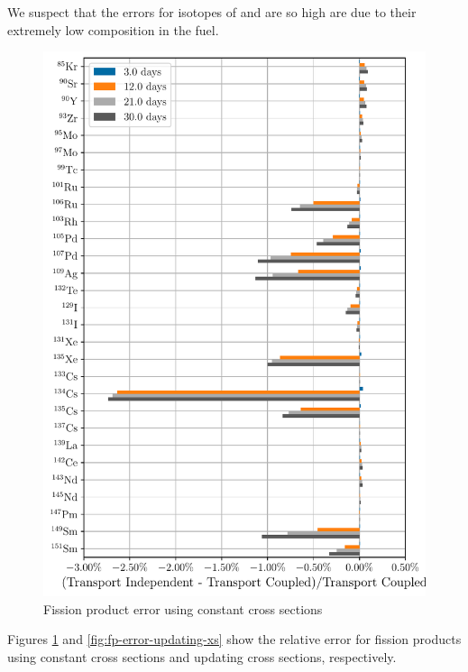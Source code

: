 \documentclass[a4paper,fleqn]{cas-dc}
\begin{document}
    We suspect that the errors for isotopes of  and  are so high
    are due to their extremely low composition in the fuel.



    \begin{figure}[h!tpb]
        \centering
        \includegraphics[width=\linewidth]{figs/fission_products_constant_xs_predictor_fission_q_days.pdf}
        \caption{Fission product error using constant cross sections}
        \label{fig:fp-error-constant-xs}
    \end{figure}

    Figures \ref{fig:fp-error-constant-xs} and \ref{fig:fp-error-updating-xs}
    show the relative error for fission products using constant cross sections
    and updating cross sections, respectively.
\end{document}
